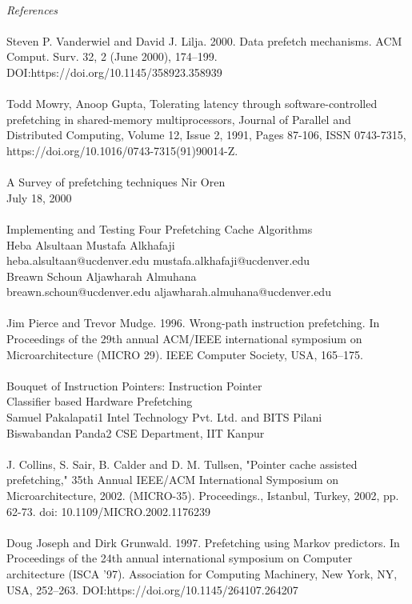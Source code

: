 \documentclass{article}
\begin{document}
\begin{enumerate}
\\\textit{References}
\\\big[1]
\\Steven P. Vanderwiel and David J. Lilja. 2000. Data prefetch mechanisms. ACM Comput. Surv. 32, 2 (June 2000), 174–199. DOI:https://doi.org/10.1145/358923.358939
\\\big[2]
\\Todd Mowry, Anoop Gupta,
Tolerating latency through software-controlled prefetching in shared-memory multiprocessors,
Journal of Parallel and Distributed Computing,
Volume 12, Issue 2,
1991,
Pages 87-106,
ISSN 0743-7315,
https://doi.org/10.1016/0743-7315(91)90014-Z.
\\\big[3]
\\A Survey of prefetching techniques Nir Oren
\\July 18, 2000
\\\big[4]
\\Implementing and Testing Four Prefetching Cache Algorithms
\\Heba Alsultaan Mustafa Alkhafaji
\\heba.alsultaan@ucdenver.edu mustafa.alkhafaji@ucdenver.edu
\\Breawn Schoun Aljawharah Almuhana
\\breawn.schoun@ucdenver.edu aljawharah.almuhana@ucdenver.edu
\\\big[5]
\\ Jim Pierce and Trevor Mudge. 1996. Wrong-path instruction prefetching. In Proceedings of the 29th annual ACM/IEEE international symposium on Microarchitecture (MICRO 29). IEEE Computer Society, USA, 165–175.
\\\big[6]
\\Bouquet of Instruction Pointers: Instruction Pointer
\\Classifier based Hardware Prefetching
\\Samuel Pakalapati1  Intel Technology Pvt. Ltd. and BITS Pilani
\\ Biswabandan Panda2  CSE Department, IIT Kanpur
\\\big[7]
\\J. Collins, S. Sair, B. Calder and D. M. Tullsen, "Pointer cache assisted prefetching," 35th Annual IEEE/ACM International Symposium on Microarchitecture, 2002. (MICRO-35). Proceedings., Istanbul, Turkey, 2002, pp. 62-73.
doi: 10.1109/MICRO.2002.1176239
\\\big[8]
\\Doug Joseph and Dirk Grunwald. 1997. Prefetching using Markov predictors. In Proceedings of the 24th annual international symposium on Computer architecture (ISCA ’97). Association for Computing Machinery, New York, NY, USA, 252–263. DOI:https://doi.org/10.1145/264107.264207

\end{enumerate}
\end{document}
